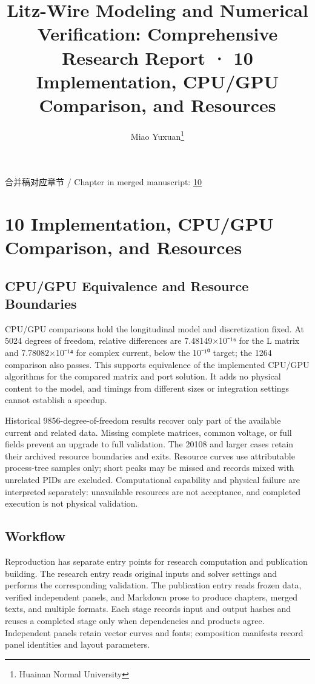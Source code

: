 \documentclass[journal,10pt]{IEEEtran}
\begin{document}
\title{Litz-Wire Modeling and Numerical Verification: Comprehensive Research Report · 10 Implementation, CPU/GPU Comparison, and Resources}
\author{Miao Yuxuan\thanks{Huainan Normal University}}

\maketitle
\noindent 合并稿对应章节 / Chapter in merged manuscript: \href{report_en_ieee.pdf#chapter-10}{10}\par
\FloatBarrier
\section*{10 Implementation, CPU/GPU Comparison, and Resources}
\hypertarget{chapter-10}{}
\subsection*{CPU/GPU Equivalence and Resource Boundaries}
\hypertarget{10.compute.heading}{}
CPU/GPU comparisons hold the longitudinal model and discretization fixed. At 5024 degrees of freedom, relative differences are 7.48149×10⁻¹⁶ for the L matrix and 7.78082×10⁻¹⁴ for complex current, below the 10⁻¹⁰ target; the 1264 comparison also passes. This supports equivalence of the implemented CPU/GPU algorithms for the compared matrix and port solution. It adds no physical content to the model, and timings from different sizes or integration settings cannot establish a speedup.


Historical 9856-degree-of-freedom results recover only part of the available current and related data. Missing complete matrices, common voltage, or full fields prevent an upgrade to full validation. The 20108 and larger cases retain their archived resource boundaries and exits. Resource curves use attributable process-tree samples only; short peaks may be missed and records mixed with unrelated PIDs are excluded. Computational capability and physical failure are interpreted separately: unavailable resources are not acceptance, and completed execution is not physical validation.


\subsection*{Workflow}
\hypertarget{10.workflow.heading}{}
Reproduction has separate entry points for research computation and publication building. The research entry reads original inputs and solver settings and performs the corresponding validation. The publication entry reads frozen data, verified independent panels, and Markdown prose to produce chapters, merged texts, and multiple formats. Each stage records input and output hashes and reuses a completed stage only when dependencies and products agree. Independent panels retain vector curves and fonts; composition manifests record panel identities and layout parameters.
\end{document}

